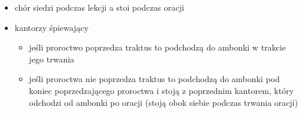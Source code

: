 \begin{itemize}
	\item chór siedzi podczas lekcji a stoi podczas oracji
	\item kantorzy śpiewający
	      \begin{itemize}
		      \item jeśli proroctwo poprzedza traktus to podchodzą do ambonki w
		            trakcie jego trwania
		      \item jeśli proroctwa nie poprzedza traktus to podchodzą do
		            ambonki pod koniec poprzedzającego proroctwa i stoją z
		            poprzednim kantorem, który odchodzi od ambonki po oracji
		            (stoją obok siebie podczas trwania oracji)
	      \end{itemize}
\end{itemize}